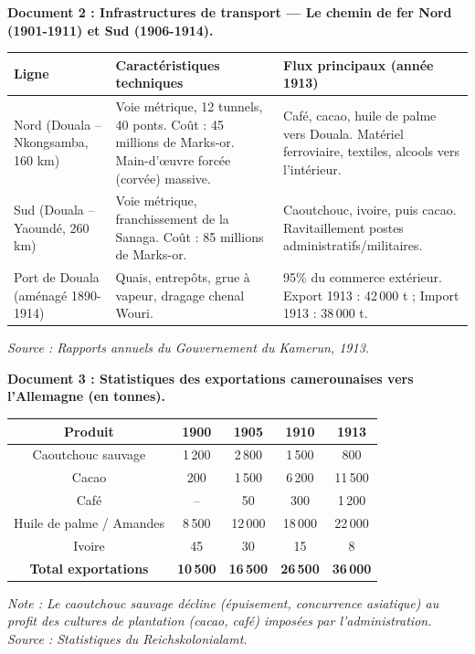 \documentclass[11pt]{article}
\begin{document}
\medskip
\textbf{Document 2 : Infrastructures de transport — Le chemin de fer Nord (1901-1911) et Sud (1906-1914).}
\begin{center}
\begin{tabularx}{\linewidth}{|l|X|X|}\hline
\rowcolor{popblueL}
\textbf{Ligne} & \textbf{Caractéristiques techniques} & \textbf{Flux principaux (année 1913)} \\ \hline
Nord (Douala -- Nkongsamba, 160 km) & Voie métrique, 12 tunnels, 40 ponts. Coût : 45 millions de Marks-or. Main-d'œuvre forcée (corvée) massive. & Café, cacao, huile de palme vers Douala. Matériel ferroviaire, textiles, alcools vers l'intérieur. \\ \hline
Sud (Douala -- Yaoundé, 260 km) & Voie métrique, franchissement de la Sanaga. Coût : 85 millions de Marks-or. & Caoutchouc, ivoire, puis cacao. Ravitaillement postes administratifs/militaires. \\ \hline
Port de Douala (aménagé 1890-1914) & Quais, entrepôts, grue à vapeur, dragage chenal Wouri. & 95\% du commerce extérieur. Export 1913 : 42\,000 t ; Import 1913 : 38\,000 t. \\ \hline
\end{tabularx}
\end{center}
\emph{Source : Rapports annuels du Gouvernement du Kamerun, 1913.}

\medskip
\textbf{Document 3 : Statistiques des exportations camerounaises vers l'Allemagne (en tonnes).}
\begin{center}
\begin{tabular}{|c|cccc|}\hline
\rowcolor{popblueL}
\textbf{Produit} & \textbf{1900} & \textbf{1905} & \textbf{1910} & \textbf{1913} \\ \hline
Caoutchouc sauvage & 1\,200 & 2\,800 & 1\,500 & 800 \\
Cacao & 200 & 1\,500 & 6\,200 & 11\,500 \\
Café & -- & 50 & 300 & 1\,200 \\
Huile de palme / Amandes & 8\,500 & 12\,000 & 18\,000 & 22\,000 \\
Ivoire & 45 & 30 & 15 & 8 \\ \hline
\textbf{Total exportations} & \textbf{10\,500} & \textbf{16\,500} & \textbf{26\,500} & \textbf{36\,000} \\ \hline
\end{tabular}
\end{center}
\emph{Note : Le caoutchouc sauvage décline (épuisement, concurrence asiatique) au profit des cultures de plantation (cacao, café) imposées par l'administration. Source : Statistiques du Reichskolonialamt.}
\end{document}
